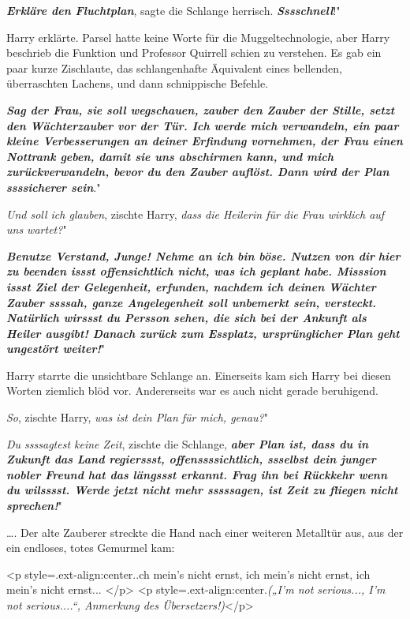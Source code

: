 \glqq \textbf{\emph{Erkläre den Fluchtplan}}\grqq{}, sagte die Schlange
herrisch. \glqq \textbf{\emph{Sssschnell}}!"

Harry erklärte. Parsel hatte keine Worte für die Muggeltechnologie, aber Harry
beschrieb die Funktion und Professor Quirrell schien zu verstehen. Es gab ein
paar kurze Zischlaute, das schlangenhafte Äquivalent eines bellenden,
überraschten Lachens, und dann schnippische Befehle.

\glqq \textbf{\emph{Sag der Frau, sie soll wegschauen, zauber den Zauber der
Stille, setzt den Wächterzauber vor der Tür. Ich werde mich verwandeln, ein paar
kleine Verbesserungen an deiner Erfindung vornehmen, der Frau einen Nottrank
geben, damit sie uns abschirmen kann, und mich zurückverwandeln, bevor du den
Zauber auflöst. Dann wird der Plan ssssicherer sein}}."

\glqq \emph{Und soll ich glauben}\grqq{}, zischte Harry, \glqq \emph{dass die
Heilerin für die Frau wirklich auf uns wartet?}"

\glqq \textbf{\emph{Benutze Verstand, Junge! Nehme an ich bin böse. Nutzen von
dir}} \textbf{\emph{hier zu beenden issst offensichtlich nicht, was ich geplant
habe. Misssion issst Ziel der Gelegenheit, erfunden, nachdem ich deinen Wächter
Zauber ssssah, ganze Angelegenheit soll unbemerkt sein, versteckt. Natürlich
wirssst du Persson sehen, die sich bei der Ankunft als Heiler ausgibt! Danach
zurück zum Essplatz, ursprünglicher Plan geht ungestört weiter!}}"

Harry starrte die unsichtbare Schlange an. Einerseits kam sich Harry bei diesen
Worten ziemlich blöd vor. Andererseits war es auch nicht gerade beruhigend.

\glqq \emph{So}\grqq{}, zischte Harry, \glqq \emph{was ist dein Plan für mich,
genau?}"

\glqq \emph{Du ssssagtest keine Zeit}\grqq{}, zischte die Schlange, \glqq
\textbf{\emph{aber Plan ist, dass du in Zukunft das Land regierssst,
offenssssichtlich, ssselbst dein junger nobler Freund hat das längssst erkannt.
Frag ihn bei Rückkehr wenn du wilsssst. Werde jetzt nicht mehr sssssagen, ist
Zeit zu fliegen nicht sprechen!}}"

…. Der alte Zauberer streckte die Hand nach einer weiteren Metalltür aus, aus
der ein endloses, totes Gemurmel kam:

<p style=\grqq{}.ext-align:center\grqq{}.\grqq{}.ch mein's nicht ernst, ich
mein's nicht ernst, ich mein's nicht ernst...\grqq{} </p> <p
style=\grqq{}.ext-align:center\grqq{}.\emph{(„I'm not serious..., I'm not
serious....“, Anmerkung des Übersetzers!)}</p>

